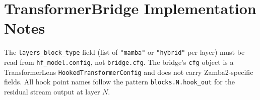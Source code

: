 \documentclass[11pt,a4paper]{article}
\begin{document}
\section{TransformerBridge Implementation Notes}

The \texttt{layers\_block\_type} field (list of \texttt{"mamba"} or \texttt{"hybrid"} per layer) must be read from \texttt{hf\_model.config}, not \texttt{bridge.cfg}. The bridge's \texttt{cfg} object is a TransformerLens \texttt{HookedTransformerConfig} and does not carry Zamba2-specific fields. All hook point names follow the pattern \texttt{blocks.N.hook\_out} for the residual stream output at layer $N$.
\end{document}
